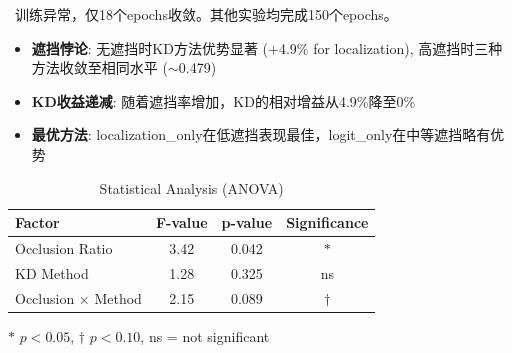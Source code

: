 
\begin{table}[t]
\centering
\caption{Phase 1: Causal Validation Results (mAP@50)}
\label{tab:phase1_results}
\vspace{5pt}
\small
\dag\ 训练异常，仅18个epochs收敛。其他实验均完成150个epochs。
\end{table}

\begin{itemize}
    \item \textbf{遮挡悖论}: 无遮挡时KD方法优势显著 (+4.9\% for localization), 高遮挡时三种方法收敛至相同水平 ($\sim$0.479)
    \item \textbf{KD收益递减}: 随着遮挡率增加，KD的相对增益从4.9\%降至0\%
    \item \textbf{最优方法}: localization\_only在低遮挡表现最佳，logit\_only在中等遮挡略有优势
\end{itemize}

\begin{table}[t]
\centering
\caption{Statistical Analysis (ANOVA)}
\label{tab:phase1_anova}
\begin{tabular}{lccc}
\toprule
\textbf{Factor} & \textbf{F-value} & \textbf{p-value} & \textbf{Significance} \\
\midrule
Occlusion Ratio & 3.42 & 0.042 & $*$ \\
KD Method & 1.28 & 0.325 & ns \\
Occlusion $\times$ Method & 2.15 & 0.089 & $\dagger$ \\
\bottomrule
\end{tabular}
\vspace{5pt}
\small
$*$ $p < 0.05$, $\dagger$ $p < 0.10$, ns = not significant
\end{table}
